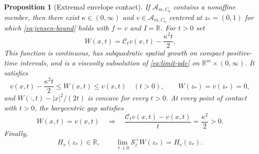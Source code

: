 \documentclass[11pt]{article}
\numberwithin{equation}{section}
\newtheorem{proposition}[theorem]{Proposition}
\theoremstyle{definition}
\theoremstyle{remark}
\newcommand{\R}{\mathbb{R}}
\newcommand{\Cenv}{\mathcal{C}}
\newcommand{\Senv}{\mathcal{S}}
\newcommand{\Aclass}{\mathcal{A}}
\begin{document}
\begin{proposition}[Extremal envelope contact]\label{prop:envelope-contact}
If $\Aclass_{m,C_0}$ contains a nonaffine member, then there
exist $\kappa\in(0,\infty)$ and $v\in\Aclass_{m,C_0}$ centered
at $z_*=(0,1)$ for which \eqref{eq:jensen-bound} holds with $f=v$ and
$I=\R$.
For $t>0$ set
\begin{equation}\label{eq:contact-envelope}
  W(x,t)=\Cenv_t v(x,t)-\frac{\kappa^2t}{2}.
\end{equation}
This function is continuous, has subquadratic spatial growth
on compact positive-time intervals, and is a viscosity
subsolution of \eqref{eq:limit-pde} on $\R^m\times(0,\infty)$.
It satisfies
\begin{equation}\label{eq:contact-sandwich}
  v(x,t)-\frac{\kappa^2t}{2}\le W(x,t)\le v(x,t)
       \quad(t>0),\qquad W(z_*)=v(z_*)=0,
\end{equation}
and $W(\cdot,t)-|x|^2/(2t)$ is concave for every $t>0$.
At every point of contact with $t>0$, the barycentric gap satisfies
\begin{equation}\label{eq:contact-barycentric-gap}
  W(x,t)=v(x,t)\quad\Longrightarrow\quad
  \frac{\Cenv_t v(x,t)-v(x,t)}{t}=\frac{\kappa^2}{2}>0.
\end{equation}
Finally,
\begin{equation}\label{eq:contact-slope}
  H_v(z_*)\in\R,\qquad
  \lim_{\ell\downarrow0}\Senv_\ell^+W(z_*)=H_v(z_*).
\end{equation}
\end{proposition}
\end{document}
